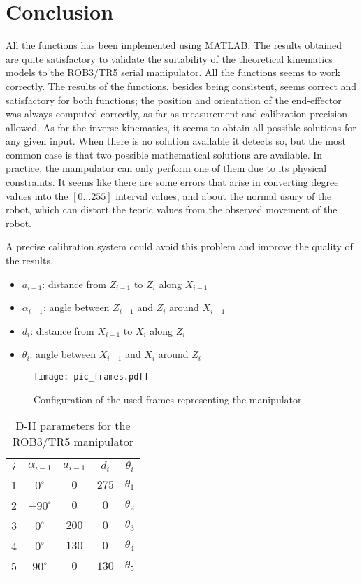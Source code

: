 \documentclass[a4paper,11pt]{article}
\begin{document}
\section{Conclusion}
All the functions has been implemented using MATLAB. The results obtained are quite satisfactory to validate the suitability of the theoretical kinematics models to the ROB3/TR5 serial manipulator. All the functions seems to work correctly. 
The results of the functions, besides being consistent, seems correct and satisfactory for both functions; the position and orientation of the end-effector was always computed correctly, as far as measurement and calibration precision allowed. As for the inverse kinematics, it seems to obtain all possible solutions for any given input. When there is no solution available it detects so, but the most common case is that two possible mathematical solutions are available. In practice, the manipulator can only perform one of them due to its physical constraints.
It seems like there are some errors that arise in converting degree values into the $[0\dots255]$ interval values, and about the normal usury of the robot, which can distort the teoric values from the observed movement of the robot. 

A precise calibration system could avoid this problem and improve the quality of the results.

\begin{itemize}
\item $a_{i-1}$: distance from $Z_{i-1}$ to $Z_{i}$ along $X_{i-1}$
\item $\alpha_{i-1}$: angle between $Z_{i-1}$ and $Z_{i}$ around $X_{i-1}$
\item $d_{i}$: distance from $X_{i-1}$ to $X_{i}$ along $Z_{i}$
\item $\theta_{i}$: angle between $X_{i-1}$ and $X_{i}$ around $Z_{i}$
\end{itemize}


\begin{figure}[h!]
\centering
\texttt{[image: pic\_frames.pdf]}
\caption{Configuration of the used frames representing the manipulator}
\label{fig:pic_frames}
\end{figure}


\begin{table}[h!]
\begin{center}
\begin{tabular}{|c|c|c|c|c|}
\hline
$i$ & $\alpha_{i-1}$ & $a_{i-1}$ & $d_{i}$ & $\theta_{i}$ \\
\hline
1 & $0^\circ$ & $0$ & $275$ & $\theta_{1}$ \\
2 & $-90^\circ$ & $0$ & $0$ & $\theta_{2}$ \\
3 & $0^\circ$ & $200$ & $0$ & $\theta_{3}$ \\
4 & $0^\circ$ & $130$ & $0$ & $\theta_{4}$ \\
5 & $90^\circ$ & $0$ & $130$ & $\theta_{5}$ \\
\hline
\end{tabular}
\caption{D-H parameters for the ROB3/TR5 manipulator}
\end{center}
\end{table}
\end{document}
